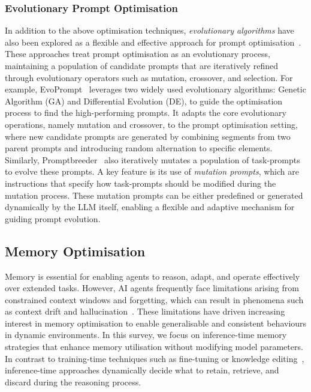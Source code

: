 \documentclass[]{selfevolagent}
\theoremstyle{plain}
\theoremstyle{definition}
\theoremstyle{remark}
\begin{document}
\subsubsection{Evolutionary Prompt Optimisation}
In addition to the above optimisation techniques, \textit{evolutionary algorithms} have also been explored as a flexible and effective approach for prompt optimisation~\citep{guo2024evoprompt,fernando2024promptbreeder}. These approaches treat prompt optimisation as an evolutionary process, maintaining a population of candidate prompts that are iteratively refined through evolutionary operators such as mutation, crossover, and selection. For example, EvoPrompt~\citep{guo2024evoprompt} leverages two widely used evolutionary algorithms: Genetic Algorithm (GA) and Differential Evolution (DE), to guide the optimisation process to find the high-performing prompts. It adapts the core evolutionary operations, namely mutation and crossover, to the prompt optimisation setting, where new candidate prompts are generated by combining segments from two parent prompts and introducing random alternation to specific elements. Similarly, Promptbreeder~\citep{fernando2024promptbreeder} also iteratively mutates a population of task-prompts to evolve these prompts. A key feature is its use of \textit{mutation prompts}, which are instructions that specify how task-prompts should be modified during the mutation process. These mutation prompts can be either predefined or generated dynamically by the LLM itself, enabling a flexible and adaptive mechanism for guiding prompt evolution. 


\subsection{Memory Optimisation}
Memory is essential for enabling agents to reason, adapt, and operate effectively over extended tasks. However, AI agents frequently face limitations arising from constrained context windows and forgetting, which can result in phenomena such as context drift and hallucination~\citep{liu2023lostmiddlelanguagemodels, zhang2024chain, zhang2024survey}. These limitations have driven increasing interest in memory optimisation to enable generalisable and consistent behaviours in dynamic environments. In this survey, we focus on inference-time memory strategies that enhance memory utilisation without modifying model parameters. In contrast to training-time techniques such as fine-tuning or knowledge editing~\citep{decao2021editingfactualknowledgelanguage,mitchell2022fastmodeleditingscale}, inference-time approaches dynamically decide what to retain, retrieve, and discard during the reasoning process.
\end{document}

